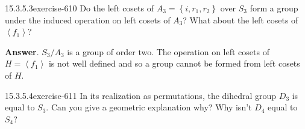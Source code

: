 \documentclass[twoside,10pt,]{book}
\numberwithin{equation}{section}
\begin{document}
\begin{divisionsolution}{15.3.5.3}{}{exercise-610}%
\hypertarget{p-5501}{}%
Do the left cosets of \(A_3=\left\{i,r_1,r_2\right\}\) over \(S_3\) form a group under the induced operation on left cosets of \(A_3\)? What about the left cosets of \(\left\langle f_1\right\rangle\)?%
\par\smallskip%
\noindent\textbf{Answer}.\quad%
\hypertarget{p-5502}{}%
\(S_3/A_3\) is a group of order two.   The operation on left cosets of \(H=\left\langle f_1\right\rangle\) is not well defined and so a group cannot be formed from left cosets of \(H\).%
\end{divisionsolution}%
\begin{divisionsolution}{15.3.5.4}{}{exercise-611}%
\hypertarget{p-5503}{}%
In its realization as permutations, the dihedral group \(D_3\) is equal to \(S_3\). Can you give a geometric explanation why?   Why isn't \(D_4\) equal to \(S_4\)?%
\end{divisionsolution}%
\end{document}
